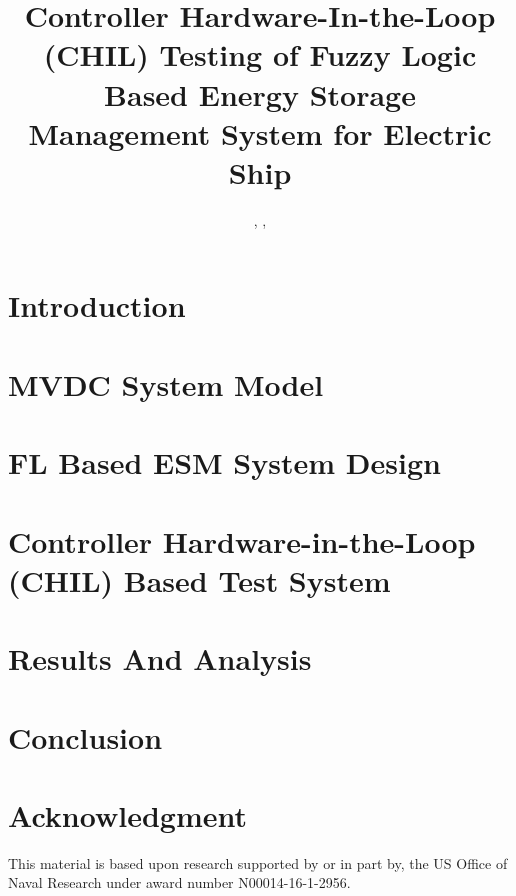 \documentclass{cta-author}
\begin{document}
\title{Controller Hardware-In-the-Loop (CHIL) Testing of Fuzzy Logic Based Energy Storage Management System for Electric Ship}
\begin{abstract}

\end{abstract}
%
\author{,
,
}
\address{
}





\maketitle


\section{Introduction}


\section{MVDC System Model}

\section{FL Based ESM System Design}

\section{Controller Hardware-in-the-Loop (CHIL) Based Test System}

\section{Results And Analysis}

%
\section{Conclusion}



\section*{Acknowledgment}
This material is based upon research supported by or in part by, the US Office of Naval Research under award number N00014-16-1-2956.



\end{document}
